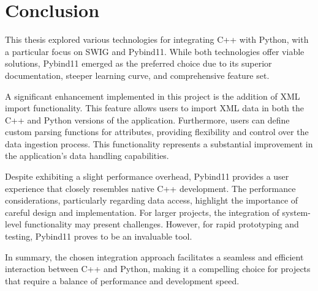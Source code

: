 \section{Conclusion}

This thesis explored various technologies for integrating C++ with Python, with a particular focus on SWIG and Pybind11. While both technologies offer viable solutions, Pybind11 emerged as the preferred choice due to its superior documentation, steeper learning curve, and comprehensive feature set.

A significant enhancement implemented in this project is the addition of XML import functionality. This feature allows users to import XML data in both the C++ and Python versions of the application. Furthermore, users can define custom parsing functions for attributes, providing flexibility and control over the data ingestion process. This functionality represents a substantial improvement in the application's data handling capabilities.

Despite exhibiting a slight performance overhead, Pybind11 provides a user experience that closely resembles native C++ development. The performance considerations, particularly regarding data access, highlight the importance of careful design and implementation. For larger projects, the integration of system-level functionality may present challenges. However, for rapid prototyping and testing, Pybind11 proves to be an invaluable tool.

In summary, the chosen integration approach facilitates a seamless and efficient interaction between C++ and Python, making it a compelling choice for projects that require a balance of performance and development speed.
